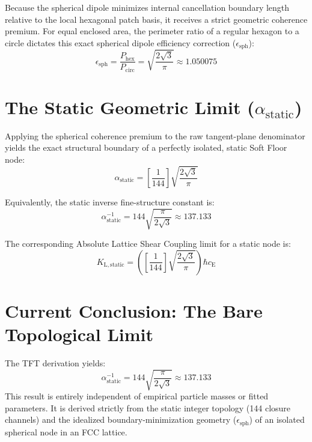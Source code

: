 Because the spherical dipole minimizes internal cancellation boundary length relative to the local hexagonal patch basis, it receives a strict geometric coherence premium. For equal enclosed area, the perimeter ratio of a regular hexagon to a circle dictates this exact spherical dipole efficiency correction ($\epsilon_{\mathrm{sph}}$):
\begin{equation}
    \epsilon_{\mathrm{sph}} = \frac{P_{\mathrm{hex}}}{P_{\mathrm{circ}}} = \sqrt{\frac{2\sqrt{3}}{\pi}} \approx 1.050075
\end{equation}

\section{The Static Geometric Limit ($\alpha_{\mathrm{static}}$)}
Applying the spherical coherence premium to the raw tangent-plane denominator yields the exact structural boundary of a perfectly isolated, static Soft Floor node:
\begin{equation}
    \alpha_{\mathrm{static}} = \left[ \frac{1}{144} \right] \sqrt{\frac{2\sqrt{3}}{\pi}}
\end{equation}

Equivalently, the static inverse fine-structure constant is:
\begin{equation}
    \alpha_{\mathrm{static}}^{-1} = 144 \sqrt{\frac{\pi}{2\sqrt{3}}} \approx 137.133
\end{equation}

The corresponding Absolute Lattice Shear Coupling limit for a static node is:
\begin{equation}
    K_{\mathrm{L,static}} = \left( \left[ \frac{1}{144} \right] \sqrt{\frac{2\sqrt{3}}{\pi}} \right) \hbar c_{\mathrm{E}}
\end{equation}

\section{Current Conclusion: The Bare Topological Limit}
The TFT derivation yields:
\begin{equation}
    \alpha_{\mathrm{static}}^{-1} = 144 \sqrt{\frac{\pi}{2\sqrt{3}}} \approx 137.133
\end{equation}
This result is entirely independent of empirical particle masses or fitted parameters. It is derived strictly from the static integer topology (144 closure channels) and the idealized boundary-minimization geometry ($\epsilon_{\mathrm{sph}}$) of an isolated spherical node in an FCC lattice.

